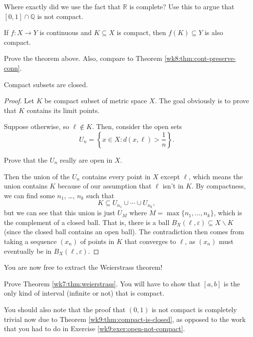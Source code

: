 \documentclass[10pt]{scrartcl}
\providecommand{\eps}{\varepsilon}
\providecommand{\QQ}{\mathbb Q}
\providecommand{\RR}{\mathbb R}
\providecommand{\setdiff}{\smallsetminus}
\begin{document}
\begin{exercise}
	Where exactly did we use the fact that $\RR$ is complete?
	Use this to argue that $[0,1]\cap\QQ$ is not compact.
\end{exercise}

\begin{theorem}
	\label{wk9:thm:cont-preserve-comp}
	If $f\colon X\to Y$ is continuous
	and $K\subseteq X$ is compact,
	then $f(K)\subseteq Y$ is also compact.
\end{theorem}

\begin{exercise}
	Prove the theorem above.
	Also, compare to Theorem \ref{wk8:thm:cont-preserve-conn}.
\end{exercise}

\begin{theorem}\label{wk9:thm:compact-is-closed}
	Compact subsets are closed.
\end{theorem}

\begin{proof}
	Let $K$ be compact subset of metric space $X$.
	The goal obviously is to prove that $K$ contains its limit points.
	
	Suppose otherwise, so $\ell\notin K$.
	Then, consider the open sets
	\[U_n = \left\{x\in X : d(x,\ell) > \frac 1n\right\}.\]
	
	\begin{exercise}
		Prove that the $U_n$ really are open in $X$.
	\end{exercise}

	Then the union of the $U_n$ contains every point in $X$ except $\ell$,
	which means the union contains $K$
	because of our assumption that $\ell$ isn't in $K$.
	By compactness, we can find some $n_1$, \dots, $n_k$ such that
	\[K\subseteq U_{n_1}\cup\cdots\cup U_{n_k},\]
	but we can see that this union is just $U_{M}$
	where $M = \max\{n_1, \dots, n_k\}$,
	which is the complement of a closed ball.
	That is, there is a ball $B_X(\ell,\eps)\subseteq X\setdiff K$
	(since the closed ball contains an open ball).
	The contradiction then comes from
	taking a sequence $(x_n)$ of points in $K$ that converges to $\ell$,
	as $(x_n)$ must eventually be in $B_X(\ell,\eps)$.
\end{proof}

You are now free to extract the Weierstrass theorem!
\begin{exercise}
	Prove Theorem \ref{wk7:thm:weierstrass}.
	You will have to show that $[a, b]$
	is the only kind of interval (infinite or not)
	that is compact.
	
	You should also note that the proof that $(0, 1)$ is not compact
	is completely trivial now due to Theorem \ref{wk9:thm:compact-is-closed},
	as opposed to the work
	that you had to do in Exercise \ref{wk9:exer:open-not-compact}.
\end{exercise}
\end{document}
